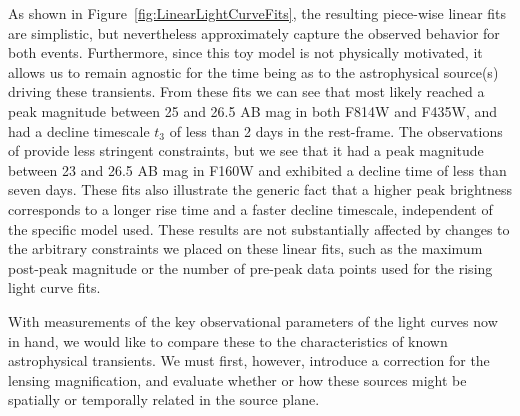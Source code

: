 As shown in Figure~\ref{fig:LinearLightCurveFits}, the resulting
piece-wise linear fits are simplistic, but nevertheless approximately
capture the observed behavior for both events.  Furthermore, since
this toy model is not physically motivated, it allows us to remain
agnostic for the time being as to the astrophysical source(s) driving
these transients.  From these fits we can see that \spockone most
likely reached a peak magnitude between 25 and 26.5 AB mag in both
F814W and F435W, and had a decline timescale $t_3$ of less than 2 days
in the rest-frame. The observations of \spocktwo provide less
stringent constraints, but we see that it had a peak magnitude between
23 and 26.5 AB mag in F160W and exhibited a decline time of less than
seven days.  These fits also illustrate the generic fact that a higher
peak brightness corresponds to a longer rise time and a faster decline
timescale, independent of the specific model used.  These results are
not substantially affected by changes to the arbitrary constraints we
placed on these linear fits, such as the maximum post-peak magnitude
or the number of pre-peak data points used for the rising light curve
fits.

With measurements of the key observational parameters of the \spock
light curves now in hand, we would like to compare these to the
characteristics of known astrophysical transients.  We must first,
however, introduce a correction for the lensing magnification, and
evaluate whether or how these sources might be spatially or temporally
related in the source plane.

